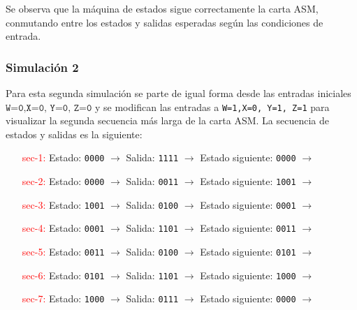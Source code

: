 \documentclass[12pt, letterpaper]{article}
\begin{document}
Se observa que la máquina de estados sigue correctamente la carta ASM, conmutando entre los estados y salidas esperadas según las condiciones de entrada.

\subsubsection*{Simulación 2}

Para esta segunda simulación se parte de igual forma desde las entradas iniciales \(\texttt{W=0,X=0, Y=0, Z=0}\) y se modifican las entradas a \texttt{W=1,X=0, Y=1, Z=1} para visualizar la segunda secuencia más larga de la carta ASM. La secuencia de estados y salidas es la siguiente:

\begin{enumerate}
    \item[\textcolor{red}{sec-1:}] Estado: \texttt{0000} \(\rightarrow\) Salida: \texttt{1111} \(\rightarrow\) Estado siguiente: \texttt{0000} \(\rightarrow\)
    \item[\textcolor{red}{sec-2:}] Estado: \texttt{0000} \(\rightarrow\) Salida: \texttt{0011} \(\rightarrow\) Estado siguiente: \texttt{1001} \(\rightarrow\)
    \item[\textcolor{red}{sec-3:}] Estado: \texttt{1001} \(\rightarrow\) Salida: \texttt{0100} \(\rightarrow\) Estado siguiente: \texttt{0001} \(\rightarrow\)
    \item[\textcolor{red}{sec-4:}] Estado: \texttt{0001} \(\rightarrow\) Salida: \texttt{1101} \(\rightarrow\) Estado siguiente: \texttt{0011} \(\rightarrow\)
    \item[\textcolor{red}{sec-5:}] Estado: \texttt{0011} \(\rightarrow\) Salida: \texttt{0100} \(\rightarrow\) Estado siguiente: \texttt{0101} \(\rightarrow\)
    \item[\textcolor{red}{sec-6:}] Estado: \texttt{0101} \(\rightarrow\) Salida: \texttt{1101} \(\rightarrow\) Estado siguiente: \texttt{1000} \(\rightarrow\)
    \item[\textcolor{red}{sec-7:}] Estado: \texttt{1000} \(\rightarrow\) Salida: \texttt{0111} \(\rightarrow\) Estado siguiente: \texttt{0000} \(\rightarrow\)
\end{enumerate}
\end{document}
